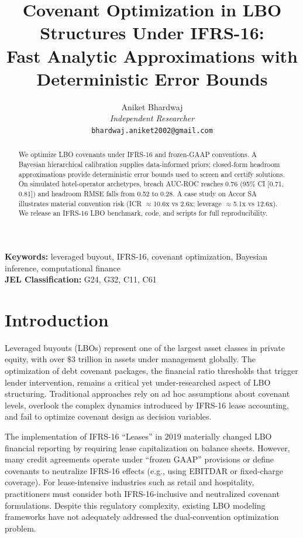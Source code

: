 \documentclass[11pt,a4paper]{article}
\title{Covenant Optimization in LBO Structures Under IFRS-16: \\
Fast Analytic Approximations with Deterministic Error Bounds}
\author{
Aniket Bhardwaj\\
\textit{Independent Researcher}\\
\texttt{bhardwaj.aniket2002@gmail.com}
}
\theoremstyle{plain}
\theoremstyle{definition}
\begin{document}
\maketitle

\begin{abstract}
We optimize LBO covenants under IFRS-16 and frozen-GAAP conventions. A Bayesian hierarchical calibration supplies data-informed priors; closed-form headroom approximations provide deterministic error bounds used to screen and certify solutions. On simulated hotel-operator archetypes, breach AUC-ROC reaches 0.76 (95\% CI [0.71, 0.81]) and headroom RMSE falls from 0.52 to 0.28. A case study on Accor SA illustrates material convention risk (ICR $\approx$10.6x vs 2.6x; leverage $\approx$5.1x vs 12.6x). We release an IFRS-16 LBO benchmark, code, and scripts for full reproducibility.
\end{abstract}

\textbf{Keywords:} leveraged buyout, IFRS-16, covenant optimization, Bayesian inference, computational finance\\
\textbf{JEL Classification:} G24, G32, C11, C61

\section{Introduction}

Leveraged buyouts (LBOs) represent one of the largest asset classes in private equity, with over $\$3$ trillion in assets under management globally. The optimization of debt covenant packages, the financial ratio thresholds that trigger lender intervention, remains a critical yet under-researched aspect of LBO structuring. Traditional approaches rely on ad hoc assumptions about covenant levels, overlook the complex dynamics introduced by IFRS-16 lease accounting, and fail to optimize covenant design as decision variables.

The implementation of IFRS-16 ``Leases'' in 2019 materially changed LBO financial reporting by requiring lease capitalization on balance sheets. However, many credit agreements operate under ``frozen GAAP'' provisions or define covenants to neutralize IFRS-16 effects (e.g., using EBITDAR or fixed-charge coverage). For lease-intensive industries such as retail and hospitality, practitioners must consider both IFRS-16-inclusive and neutralized covenant formulations. Despite this regulatory complexity, existing LBO modeling frameworks have not adequately addressed the dual-convention optimization problem.
\end{document}
